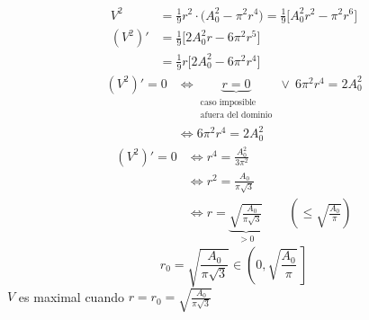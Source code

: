 \documentclass[11pt,a4paper]{article}
\begin{document}
\begin{ejemplo}
  \begin{align*}
    V^2&=\frac19 r^2\cdot\bigl(A_0^2-\pi^2r^4\bigr)
        =\frac19\bigl[A_0^2r^2-\pi^2r^6\bigr]\\
    (V^2)'&=\frac19\bigl[2A_0^2r-6\pi^2r^5\bigr]\\
    &=\frac19 r\bigl[2A_0^2-6\pi^2r^4\bigr]
  \end{align*}
  \begin{align*}
    (V^2)'=0
    &\iff\underbrace{r=0}_{\substack{\text{caso imposible}\\
      \text{afuera del dominio}}}\ \lor\ 6\pi^2r^4=2A_0^2\\
    &\iff 6\pi^2r^4=2A_0^2
  \end{align*}
  \begin{align*}
    (V^2)'=0&\iff r^4=\frac{A_0^2}{3\pi^2}\\
    &\iff r^2=\frac{A_0}{\pi\sqrt3}\\
    &\iff r=\underbrace{\sqrt{\frac{A_0}{\pi\sqrt3}}}_{>0}
      \qquad\left(\leq\sqrt{\frac{A_0}{\pi}}\right)
  \end{align*}
  \[
    r_0=\sqrt{\frac{A_0}{\pi\sqrt3}}\in\left(0,\sqrt{\frac{A_0}{\pi}}\,\right]
  \]
  $V$ es maximal cuando $\displaystyle r=r_0=\sqrt{\frac{A_0}{\pi\sqrt3}}$
\end{ejemplo}

\end{document}
